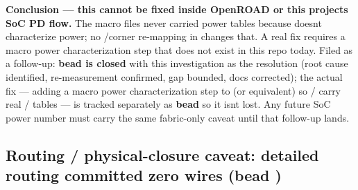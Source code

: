 \begin{record}
\textbf{Conclusion --- this cannot be fixed inside OpenROAD or this
project\textquotesingle s SoC PD flow.} The macro  files
never carried power tables because 
doesn\textquotesingle t characterize power; no /corner
re-mapping in  changes that. A real fix requires a
macro power characterization step that does not exist in this repo
today. Filed as a follow-up: \textbf{bead 
is closed} with this investigation as the resolution (root cause
identified, re-measurement confirmed, gap bounded, docs corrected); the
actual fix --- adding a macro power characterization step to
 (or equivalent) so
/ carry real
/ tables --- is tracked
separately as \textbf{bead } so it
isn\textquotesingle t lost. Any future SoC power number must carry the
same \warn{} fabric-only caveat until that follow-up lands.

\end{record}

\subsection{\texorpdfstring{Routing / physical-closure caveat: detailed
routing committed zero wires (bead
)}{Routing / physical-closure caveat: detailed routing committed zero wires (bead )}}\label{cr:run:phase5:routing-physical-closure-caveat-detailed-routing-committed-zero-wires-bead-xy6}

